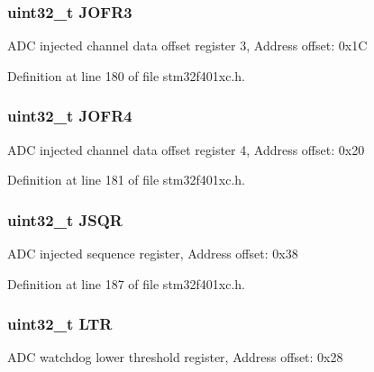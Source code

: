 \subsubsection[{\texorpdfstring{J\+O\+F\+R3}{JOFR3}}]{ uint32\+\_\+t J\+O\+F\+R3}\hypertarget{struct_a_d_c___type_def_a613f6b76d20c1a513976b920ecd7f4f8}{}\label{struct_a_d_c___type_def_a613f6b76d20c1a513976b920ecd7f4f8}
A\+DC injected channel data offset register 3, Address offset\+: 0x1C 

Definition at line 180 of file stm32f401xc.\+h.

\subsubsection[{\texorpdfstring{J\+O\+F\+R4}{JOFR4}}]{ uint32\+\_\+t J\+O\+F\+R4}\hypertarget{struct_a_d_c___type_def_a2fd59854223e38158b4138ee8e913ab3}{}\label{struct_a_d_c___type_def_a2fd59854223e38158b4138ee8e913ab3}
A\+DC injected channel data offset register 4, Address offset\+: 0x20 

Definition at line 181 of file stm32f401xc.\+h.

\subsubsection[{\texorpdfstring{J\+S\+QR}{JSQR}}]{ uint32\+\_\+t J\+S\+QR}\hypertarget{struct_a_d_c___type_def_a75e0cc079831adcc051df456737d3ae4}{}\label{struct_a_d_c___type_def_a75e0cc079831adcc051df456737d3ae4}
A\+DC injected sequence register, Address offset\+: 0x38 

Definition at line 187 of file stm32f401xc.\+h.

\subsubsection[{\texorpdfstring{L\+TR}{LTR}}]{ uint32\+\_\+t L\+TR}\hypertarget{struct_a_d_c___type_def_a9f8712dfef7125c0bb39db11f2b7416b}{}\label{struct_a_d_c___type_def_a9f8712dfef7125c0bb39db11f2b7416b}
A\+DC watchdog lower threshold register, Address offset\+: 0x28 

